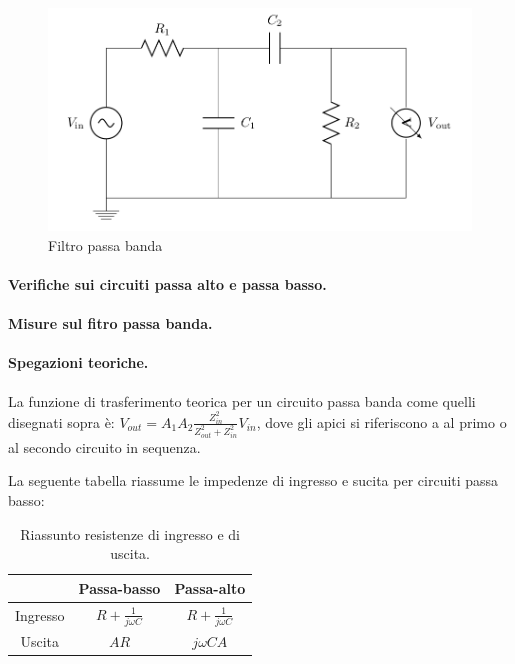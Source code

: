 \documentclass[10pt,a4paper]{article}
\begin{document}
\begin{figure}[h]
\centering
\includegraphics[scale=0.4]{passabanda.png}
\caption{Filtro passa banda}
\end{figure}

\paragraph{Verifiche sui circuiti passa alto e passa basso.}

\paragraph{Misure sul fitro passa banda.}

\paragraph{Spegazioni teoriche.}
La funzione di trasferimento teorica per un circuito passa banda come quelli disegnati sopra è: 
$V_{out} = A_{1} A_{2} \frac{Z_{in}^2}{Z_{out}^2+Z_{in}^2} V_{in}$, dove gli apici si riferiscono a al primo o al secondo circuito in sequenza. 

La seguente tabella riassume le impedenze di ingresso e sucita per circuiti passa basso:

\begin{table}[h]
\centering
\begin{tabular}{|c|c|c|}
\hline 
 & Passa-basso  & Passa-alto \\
\hline 
Ingresso & $R+\frac{1}{j \omega C}$ & $R+\frac{1}{j \omega C}$\\ 
Uscita & $AR$ & $j \omega C A$\\
\hline 
\end{tabular} 
\caption{Riassunto resistenze di ingresso e di uscita.}
\end{table}
\end{document}
